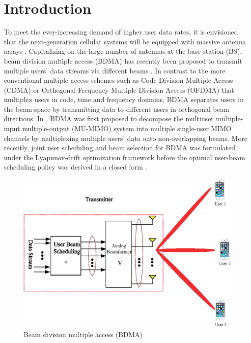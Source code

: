 \documentclass[conference]{IEEEtran}
\begin{document}
\section{Introduction}
To meet the ever-increasing demand of higher user data rates, it is envisioned that the next-generation cellular systems will be equipped with massive antenna arrays \cite{boccardi2014five}. Capitalizing on the large number of antennas at the base-station (BS), beam division multiple access (BDMA) has recently been proposed to transmit multiple users' data streams via different beams \cite{sun2015beam, Jiang2018}. In contrast to the more conventional multiple access schemes such as Code Division Multiple Access (CDMA) or Orthogonal Frequency Multiple Division Access (OFDMA) that multiplex users in code, time and frequency domains, BDMA separates users in the beam space by transmitting data to different users in orthogonal beam directions. In \cite{sun2015beam}, BDMA was first proposed to decompose the multiuser multiple-input multiple-output (MU-MIMO) system into multiple single-user MIMO channels by multiplexing multiple users' data onto non-overlapping beams. More recently, joint user scheduling and beam selection for BDMA was formulated under the Lyapunov-drift optimization framework before the optimal user-beam scheduling policy was derived in a closed form \cite{Jiang2018}.

\begin{figure}[h]
	\begin{center}
		\includegraphics[scale=0.55]{Figure/BDMA.eps}
		\caption{Beam division multiple access (BDMA)}\label{fig:BDMA}
	\end{center}
\end{figure}
\end{document}
